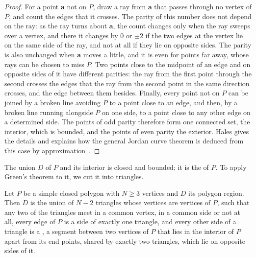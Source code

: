 \begin{proof}
For a point $\mathbf a$ not on $P$, draw a ray from $\mathbf a$ that passes through no vertex of $P$, and count the edges that it crosses. The parity of this number does not depend on the ray: as the ray turns about $\mathbf a$, the count changes only when the ray sweeps over a vertex, and there it changes by $0$ or $\pm2$ if the two edges at the vertex lie on the same side of the ray, and not at all if they lie on opposite sides. The parity is also unchanged when $\mathbf a$ moves a little, and it is even for points far away, whose rays can be chosen to miss $P$. Two points close to the midpoint of an edge and on opposite sides of it have different parities: the ray from the first point through the second crosses the edges that the ray from the second point in the same direction crosses, and the edge between them besides. Finally, every point not on $P$ can be joined by a broken line avoiding $P$ to a point close to an edge, and then, by a broken line running alongside $P$ on one side, to a point close to any other edge on a determined side. The points of odd parity therefore form one connected set, the interior, which is bounded, and the points of even parity the exterior. Hales gives the details and explains how the general Jordan curve theorem is deduced from this case by approximation~\cite{hales2007}.
\end{proof}

The union $D$ of $P$ and its interior is closed and bounded; it is the  of $P$. To apply Green's theorem to it, we cut it into triangles.

\begin{theorem}
\label{thm:triangulation}
Let $P$ be a simple closed polygon with $N\ge3$ vertices and $D$ its polygon region. Then $D$ is the union of $N-2$ triangles whose vertices are vertices of $P$, such that any two of the triangles meet in a common vertex, in a common side or not at all, every edge of $P$ is a side of exactly one triangle, and every other side of a triangle is a , a segment between two vertices of $P$ that lies in the interior of $P$ apart from its end points, shared by exactly two triangles, which lie on opposite sides of it.
\end{theorem}

